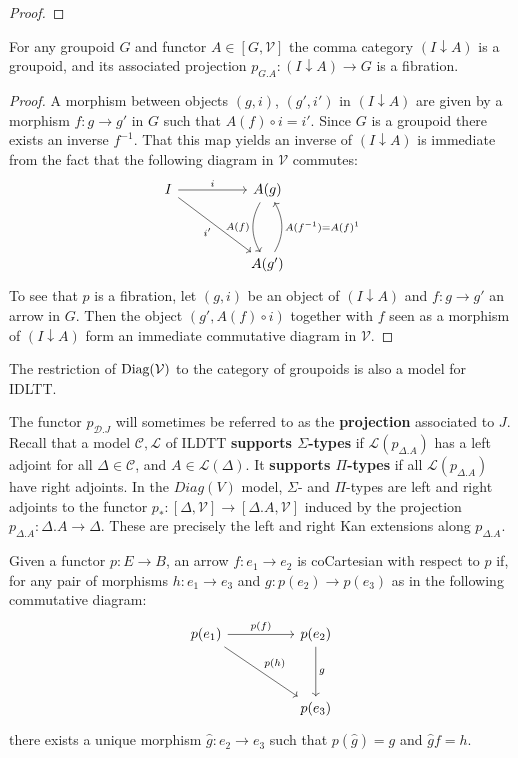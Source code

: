 \begin{thm}
\begin{proof}
\end{proof}
\begin{lem}
For any groupoid $G$ and functor $A \in [G, \mathcal{V}]$ the comma category $(I \downarrow A)$ is a groupoid, and its associated projection $p_{G.A} : (I \downarrow A) \to G$ is a fibration.
\begin{proof}
A morphism between objects $(g, i)$, $(g', i')$ in $(I \downarrow A)$ are given by a morphism $f : g \to g'$ in $G$ such that $A(f) \circ i = i'$. Since $G$ is a groupoid there exists an inverse $f^{-1}$. That this map yields an inverse of $(I \downarrow A)$ is immediate from the fact that the following diagram in $\mathcal{V}$ commutes:
\[
\ti
I \ar[rd,"i'",swap] \ar[r, "i"] & A(g) \ar[d, "A(f)", bend right,swap] \\
& A(g') \ar[u, "A(f^{-1}) = A(f)^{1}", bend right,swap]
\kz
\]
To see that $p$ is a fibration, let $(g, i)$ be an object of $(I \downarrow A)$ and $f : g \to g'$ an arrow in $G$. Then the object $(g', A(f)\circ i)$ together with $f$ seen as a morphism of $(I \downarrow A)$ form an immediate commutative diagram in $\mathcal{V}$.
\end{proof}
\end{lem}
\begin{cor}
The restriction of $\operatorname{\text{Diag}}(\mathcal{V})$ to the category of groupoids is also a model for IDLTT.
\end{cor}

\end{thm}
The functor $p_{\mathcal{D}.J}$ will sometimes be referred to as the \textbf{projection} associated to $J$.
Recall that a model $\mathcal{C}, \mathcal{L}$ of ILDTT \textbf{supports $\Sigma$-types} if $\mathcal{L}(p_{\Delta.A})$ has a left adjoint for all $\Delta \in \mathcal{C}$, and $A \in \mathcal{L}(\Delta)$. It \textbf{supports $\Pi$-types} if all $\mathcal{L}(p_{\Delta.A})$ have right adjoints.
In the $Diag(V)$ model, $\Sigma$- and $\Pi$-types are left and right adjoints to the functor $p_* : [\Delta, \mathcal{V}] \to [\Delta.A, \mathcal{V}]$ induced by the projection $p_{\Delta.A} : \Delta.A \to \Delta$. These are precisely the left and right Kan extensions along $p_{\Delta.A}$.
\begin{defn}
Given a functor $p : E \to B$, an arrow $f : e_1 \to e_2$ is coCartesian with respect to $p$ if, for any pair of morphisms $h : e_1 \to e_3$ and $g : p(e_2) \to p(e_3)$ as in the following commutative diagram:
\[
\ti
p(e_1) \ar[r, "p(f)"] \ar[rd, "p(h)"] & p(e_2) \ar[d, "g"] \\
& p(e_3)
\kz
\]
there exists a unique morphism $\hat g : e_2 \to e_3$ such that $p(\hat g) = g$ and $\hat g f = h$.
\end{defn}
